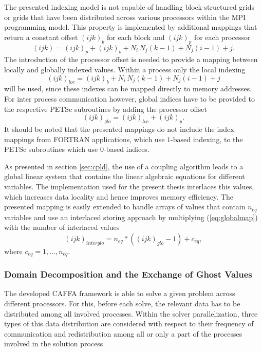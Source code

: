 The presented indexing model is not capable of handling block-structured grids or grids that have been distributed across various processors within the MPI programming model. This property is implemented by additional mappings that return a constant offset \((ijk)_b\) for each block and \((ijk)_p\) for each processor
\begin{displaymath}
  (ijk) = (ijk)_p + (ijk)_b +  N_i \, N_j \left(k - 1\right) + N_j \left(i - 1\right) + j.
\end{displaymath}
The introduction of the processor offset is needed to provide a mapping between locally and globally indexed values. Within a process only the local indexing 
\begin{displaymath}
  (ijk)_{loc} = (ijk)_b +  N_i \, N_j \left(k - 1\right) + N_j \left(i - 1\right) + j
\end{displaymath}
will be used, since these indexes can be mapped directly to memory addresses. For inter process communication however, global indices have to be provided to the respective PETSc subroutines by adding the processor offset
\begin{equation}
  \label{eq:globalmap}
  (ijk)_{glo} = (ijk)_{loc} + (ijk)_p.
\end{equation}
It should be noted that the presented mappings do not include the index mappings from FORTRAN applications, which use \(1\)-based indexing, to the PETSc subroutines which use \(0\)-based indices.

As presented in section \ref{sec:cpld}, the use of a coupling algorithm leads to a global linear system that contains the linear algebraic equations for different variables. The implementation used for the present thesis interlaces this values, which increases data locality and hence improves memory efficiency. The presented mapping is easily extended to handle arrays of values that contain \(n_{eq}\) variables and use an interlaced storing approach by multiplying (\ref{eq:globalmap}) with the number of interlaced values
\begin{displaymath}
  (ijk)_{interglo} = n_{eq} * \left( (ijk)_{glo}  - 1 \right) + c_{eq},
\end{displaymath}
where \(c_{eq} = 1,\dots,n_{eq} \).

\subsubsection{Domain Decomposition and the Exchange of Ghost Values}

The developed CAFFA framework is able to solve a given problem across different processors. For this, before each solve, the relevant data has to be distributed among all involved processes. Within the solver parallelization, three types of this data distribution are considered with respect to their frequency of communication and redistribution among all or only a part of the processes involved in the solution process. 

